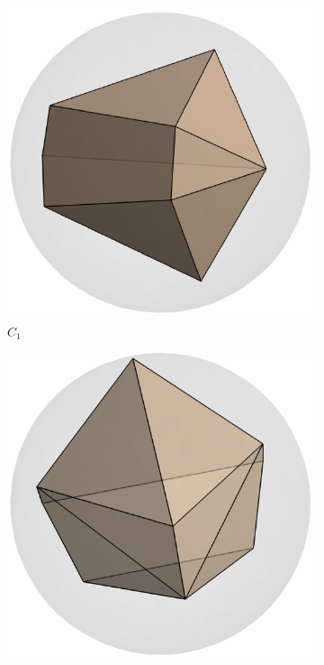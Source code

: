 \documentclass[12pt]{amsart}
\theoremstyle{plain}
\numberwithin{equation}{section}
\begin{document}
\begin{figure}[H]
	\centering
	\begin{subfigure}[b]{0.22\textwidth}
		\centering
		\includegraphics[scale=0.4]{./figures/small_C1.pdf}
		\caption{$C_1$}
	\end{subfigure}
	\hfill
	\begin{subfigure}[b]{0.22\textwidth}
		\centering
		\includegraphics[scale=0.4]{./figures/small_C2.pdf}

\end{subfigure}
\end{figure}
\end{document}
